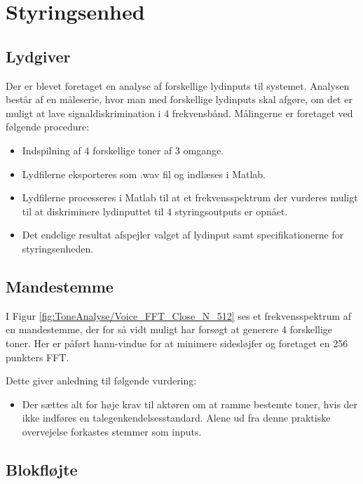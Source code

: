 {
\def\dirfigs{figs/Analyse/Styringsenhed/}
\section{Styringsenhed}\label{sec:Styringsenhed:analyse}
\subsection{Lydgiver}
Der er blevet foretaget en analyse af forskellige lydinputs til systemet. Analysen består af en måleserie, hvor man med forskellige lydinputs skal afgøre, om det er muligt at lave signaldiskrimination i 4 frekvensbånd. Målingerne er foretaget ved følgende procedure:
\begin{itemize}
    \item Indspilning af 4 forskellige toner af 3 omgange.
    \item Lydfilerne eksporteres som .wav fil og indlæses i Matlab.
    \item Lydfilerne processeres i Matlab til at et frekvensspektrum der vurderes muligt til at diskriminere lydinputtet til 4 styringsoutputs er opnået. 
    \item Det endelige resultat afspejler valget af lydinput samt specifikationerne for styringsenheden.
\end{itemize}

\subsection{Mandestemme}

I Figur \ref{fig:ToneAnalyse/Voice_FFT_Close_N_512} ses et frekvensspektrum af en mandestemme, der for så vidt muligt har forsøgt at generere 4 forskellige toner. Her er påført hann-vindue for at minimere sidesløjfer og foretaget en 256 punkters FFT.

Dette giver anledning til følgende vurdering:
\begin{itemize}
    \item Der sættes alt for høje krav til aktøren om at ramme bestemte toner, hvis der ikke indføres en talegenkendelsesstandard. Alene ud fra denne praktiske overvejelse forkastes stemmer som inputs. 
\end{itemize}

\subsection{Blokfløjte}

}
